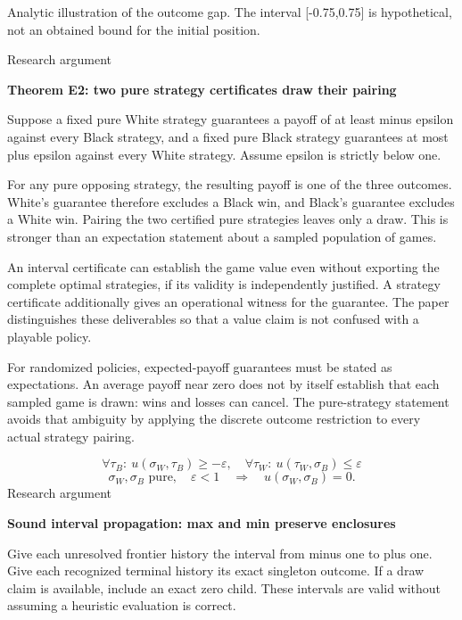 \documentclass[10pt]{article}
\begin{document}
{\footnotesize Analytic illustration of the outcome gap. The interval [-0.75,0.75] is hypothetical, not an obtained bound for the initial position.\par}
\clearpage
{\small\color{accent}Research argument}\par
{\LARGE\bfseries\color{ink}Theorem E2: two pure strategy certificates draw their pairing}\par\vspace{7pt}
Suppose a fixed pure White strategy guarantees a payoff of at least minus epsilon against every Black strategy, and a fixed pure Black strategy guarantees at most plus epsilon against every White strategy. Assume epsilon is strictly below one.\par
For any pure opposing strategy, the resulting payoff is one of the three outcomes. White's guarantee therefore excludes a Black win, and Black's guarantee excludes a White win. Pairing the two certified pure strategies leaves only a draw. This is stronger than an expectation statement about a sampled population of games.\par
An interval certificate can establish the game value even without exporting the complete optimal strategies, if its validity is independently justified. A strategy certificate additionally gives an operational witness for the guarantee. The paper distinguishes these deliverables so that a value claim is not confused with a playable policy.\par
For randomized policies, expected-payoff guarantees must be stated as expectations. An average payoff near zero does not by itself establish that each sampled game is drawn: wins and losses can cancel. The pure-strategy statement avoids that ambiguity by applying the discrete outcome restriction to every actual strategy pairing.\par
\[\forall\tau_B:\ u(\sigma_W,\tau_B)\geq-\varepsilon,\quad\forall\tau_W:\ u(\tau_W,\sigma_B)\leq\varepsilon\]
\[\sigma_W,\sigma_B\text{ pure},\quad\varepsilon<1\quad\Longrightarrow\quad u(\sigma_W,\sigma_B)=0.\]
\clearpage
{\small\color{accent}Research argument}\par
{\LARGE\bfseries\color{ink}Sound interval propagation: max and min preserve enclosures}\par\vspace{7pt}
Give each unresolved frontier history the interval from minus one to plus one. Give each recognized terminal history its exact singleton outcome. If a draw claim is available, include an exact zero child. These intervals are valid without assuming a heuristic evaluation is correct.\par
\end{document}
